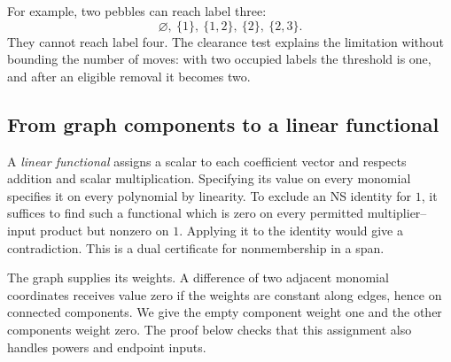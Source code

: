 \documentclass[11pt,a4paper,oneside,openany]{book}
\theoremstyle{definition}\newtheorem{definition}[theorem]{Definition}
\theoremstyle{remark}\newtheorem{remark}[theorem]{Remark}
\numberwithin{equation}{chapter}
\begin{document}
For example, two pebbles can reach label three:
\[
 \varnothing,\ \{1\},\ \{1,2\},\ \{2\},\ \{2,3\}.
\]
They cannot reach label four. The clearance test explains the limitation
without bounding the number of moves: with two occupied labels the
threshold is one, and after an eligible removal it becomes two.

\subsection{From graph components to a linear functional}
A \emph{linear functional} assigns a scalar to each coefficient vector
and respects addition and scalar multiplication. Specifying its value
on every monomial specifies it on every polynomial by linearity.
To exclude an NS identity for $1$, it suffices to find such a functional
which is zero on every permitted multiplier--input product but nonzero
on $1$. Applying it to the identity would give a contradiction.
This is a dual certificate for nonmembership in a span.

The graph supplies its weights. A difference of two adjacent monomial
coordinates receives value zero if the weights are constant along
edges, hence on connected components. We give the empty component
weight one and the other components weight zero. The proof below
checks that this assignment also handles powers and endpoint inputs.
\end{document}
